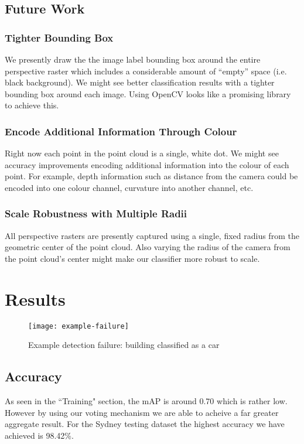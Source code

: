 \documentclass[runningheads,a4paper]{llncs}
\begin{document}
\subsection{Future Work}
\subsubsection{Tighter Bounding Box}
We presently draw the the image label bounding box around the entire perspective
raster which includes a considerable amount of “empty” space (i.e. black
background). We might see better classification results with a tighter bounding
box around each image. Using OpenCV looks like a promising library to achieve
this.

\subsubsection{Encode Additional Information Through Colour}
Right now each point in the point cloud is a single, white dot. We might see
accuracy improvements encoding additional information into the colour of each
point. For example, depth information such as distance from the camera could be
encoded into one colour channel, curvature into another channel, etc.

\subsubsection{Scale Robustness with Multiple Radii}
All perspective rasters are presently captured using a single, fixed radius
from the geometric center of the point cloud. Also varying the radius of the
camera from the point cloud’s center might make our classifier more robust to
scale. 

\section{Results}

\begin{figure}[h]
  \caption{Example detection failure: building classified as a car}
  \centering
  \texttt{[image: example-failure]}
  \label{fig:example-failure}
\end{figure}

\subsection{Accuracy}
As seen in the ``Training" section, the mAP is around 0.70 which is rather low. 
However by using our voting mechanism we are able to acheive a far greater aggregate
result. For the Sydney testing dataset the highest accuracy we have achieved is 98.42\%.
\end{document}
